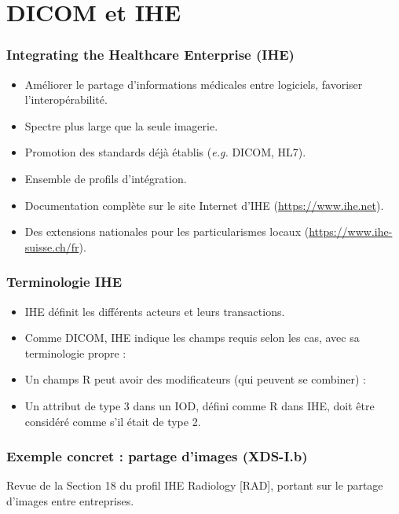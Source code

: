 \section{DICOM et IHE}

 \frame
 {
 	\frametitle{Integrating the Healthcare Enterprise (IHE)}
	
	\begin{itemize} 	 	
		\item Am\'eliorer le partage d'informations m\'edicales entre logiciels, favoriser l'interop\'erabilit\'e.
		\item<2-> Spectre plus large que la seule imagerie.
		\item<3-> Promotion des standards d\'ej\`a \'etablis (\emph{e.g.} DICOM, HL7).
		\item<4-> Ensemble de profils d'int\'egration.
		\item<5-> Documentation compl\`ete sur le site Internet d'IHE (\url{https://www.ihe.net}).
		\item<6-> Des extensions nationales pour les particularismes locaux (\url{https://www.ihe-suisse.ch/fr}).
	\end{itemize}

 }

\frame
 {
 	\frametitle{Terminologie IHE}
	
	\begin{itemize}
		\item IHE d\'efinit les diff\'erents acteurs et leurs transactions.
		\item<2-> Comme DICOM, IHE indique les champs requis selon les cas, avec sa terminologie propre :	
		\item<5-> Un champs R peut avoir des modificateurs (qui peuvent se combiner) :
		\item<8-> Un attribut de type 3 dans un IOD, d\'efini comme R dans IHE, doit \^etre consid\'er\'e comme s'il \'etait de type 2.
	\end{itemize}
	
 }

\frame
 {
 	\frametitle{Exemple concret : partage d'images (XDS-I.b)}
	Revue de la Section 18 du profil IHE Radiology [RAD], portant sur le partage d'images entre entreprises.
 }
